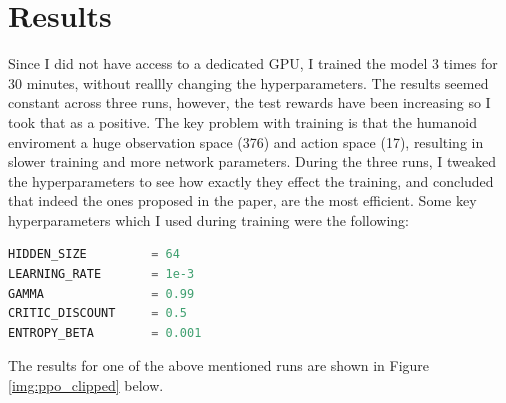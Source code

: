 \documentclass[12pt,a4paper]{article}
\begin{document}
\section{Results}\label{results}

Since I did not have access to a dedicated GPU, I trained the model 3 times for 30 minutes, without reallly changing the hyperparameters. The results seemed constant across three runs, however, the test rewards have been increasing so I took that as a positive. The key problem with training is that the humanoid enviroment a huge observation space (376) and action space (17), resulting in slower training and more network parameters. During the three runs, I tweaked the hyperparameters to see how exactly they effect the training, and concluded that indeed the ones proposed in the paper, are the most efficient. Some key hyperparameters which I used during training were the following:  
\begin{lstlisting}[language=Python]
HIDDEN_SIZE         = 64
LEARNING_RATE       = 1e-3
GAMMA               = 0.99
CRITIC_DISCOUNT     = 0.5
ENTROPY_BETA        = 0.001
\end{lstlisting}
The results  for one of the above mentioned runs are shown in Figure \ref{img:ppo_clipped} below. 
\end{document}
